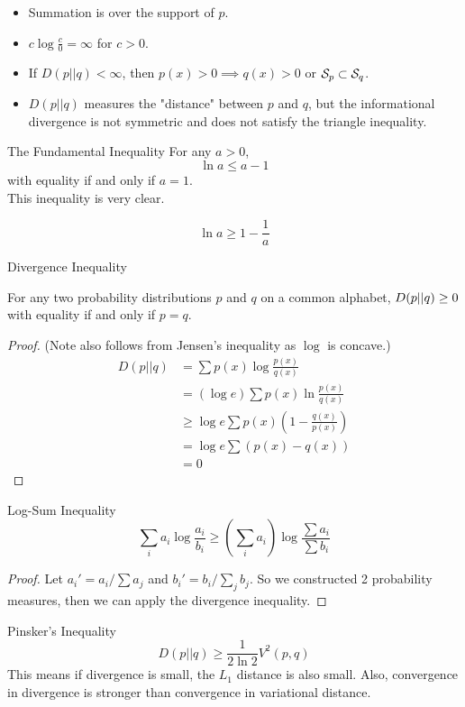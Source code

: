 \documentclass[../main.tex]{subfiles}
\begin{document}
\begin{itemize}
    \item Summation is over the support of $p$.
    \item $c\log\frac{c}{0} = \infty$ for $c>0$.
    \item If $D(p||q) < \infty$, then $p(x)>0\implies q(x)>0$ or $\S_p\subset \S_q$.
    \item $D(p||q)$ measures the "distance" between $p$ and $q$, but the informational divergence is not symmetric and does not satisfy the triangle inequality.
\end{itemize}
\begin{bbox}{The Fundamental Inequality} For any $a>0$, \begin{equation*}
    \ln a \leq a-1
\end{equation*} with equality if and only if $a=1$.\\
This inequality is very clear.
\begin{corollary*}
    \begin{equation*}
        \ln a \geq 1-\frac{1}{a}
    \end{equation*}
\end{corollary*}
\end{bbox}
\begin{bbox}{Divergence Inequality}
\begin{theorem*}
    For any two probability distributions $p$ and $q$ on a common alphabet, $\D(p||q)\geq 0$ with equality if and only if $p=q$.
\end{theorem*}
\begin{proof}
(Note also follows from Jensen's inequality as $\log$ is concave.)
    \begin{align*}
        D(p||q) &= \sum p(x)\log \frac{p(x)}{q(x)}\\
        &= (\log e)\sum p(x)\ln\frac{p(x)}{q(x)}\\
        &\geq \log e \sum p(x) (1-\frac{q(x)}{p(x)})\\
        &= \log e \sum (p(x)-q(x))\\
        &= 0
    \end{align*}
\end{proof}
\end{bbox}
\begin{bbox}{Log-Sum Inequality}
    \begin{equation*}
        \sum_i a_i\log\frac{a_i}{b_i}\geq (\sum_i a_i)\log\frac{\sum a_i}{\sum b_i}
    \end{equation*}
    \begin{proof}
        Let $a_i' = a_i/\sum a_j$ and $b_i'=b_i/\sum_j b_j$. So we constructed 2 probability measures, then we can apply the divergence inequality.
    \end{proof}
\end{bbox}
\begin{bbox}{Pinsker's Inequality}
    \begin{equation*}
        D(p||q)\geq \frac{1}{2\ln2}V^2(p,q)
    \end{equation*}
    This means if divergence is small, the $L_1$ distance is also small. Also, convergence in divergence is stronger than convergence in variational distance.
\end{bbox}
\end{document}
